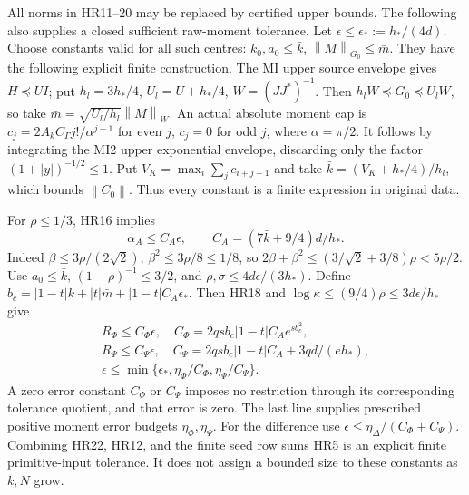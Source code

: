 \documentclass[11pt]{article}
\newcommand{\norm}[1]{\left\lVert#1\right\rVert}
\begin{document}
All norms in HR11--20 may be replaced by certified upper bounds.
The following also supplies a closed sufficient raw-moment tolerance.
Let \(\epsilon\le\epsilon_*:=h_*/(4d)\). Choose constants valid for
all such centres:
\(k_0,a_0\le\bar k\), \(\norm M_{G_0}\le\bar m\).
They have the following explicit finite construction. The MI upper
source envelope gives \(H\preceq UI\); put
\(h_l=3h_*/4\), \(U_l=U+h_*/4\), \(W=(JJ^*)^{-1}\).
Then \(h_lW\preceq G_0\preceq U_lW\), so take
\(\bar m=\sqrt{U_l/h_l}\norm M_W\).
An actual absolute moment cap is
\(c_j=2A_kC_\Gamma j!/\alpha^{j+1}\) for even \(j\),
\(c_j=0\) for odd \(j\), where \(\alpha=\pi/2\).
It follows by integrating the MI2 upper exponential envelope,
discarding only the factor \((1+|y|)^{-1/2}\le1\).
Put \(V_K=\max_i\sum_j c_{i+j+1}\) and take
\(\bar k=(V_K+h_*/4)/h_l\), which bounds \(\norm{C_0}\).
Thus every constant is a finite expression in original data.

For \(\rho\le1/3\), HR16 implies
\begin{equation}\tag{HR21}\label{HR21}
\alpha_A\le C_A\epsilon,\qquad
C_A=(7\bar k+9/4)d/h_*.
\end{equation}
Indeed \(\beta\le3\rho/(2\sqrt2)\),
\(\beta^2\le3\rho/8\le1/8\), so
\(2\beta+\beta^2\le(3/\sqrt2+3/8)\rho<5\rho/2\).
Use \(a_0\le\bar k\), \((1-\rho)^{-1}\le3/2\), and
\(\rho,\sigma\le4d\epsilon/(3h_*)\).
Define \(b_c=|1-t|\bar k+|t|\bar m+|1-t|C_A\epsilon_*\).
Then HR18 and \(\log\kappa\le(9/4)\rho\le3d\epsilon/h_*\) give
\begin{equation}\tag{HR22}\label{HR22}
\begin{gathered}
R_\Phi\le C_\Phi\epsilon,\quad
C_\Phi=2qs b_c|1-t|C_A e^{s b_c^2},\\
R_\Psi\le C_\Psi\epsilon,\quad
C_\Psi=2qs b_c|1-t|C_A+3qd/(e h_*),\\
\epsilon\le\min\{\epsilon_*,\eta_\Phi/C_\Phi,
\eta_\Psi/C_\Psi\}.
\end{gathered}
\end{equation}
A zero error constant \(C_\Phi\) or \(C_\Psi\) imposes no restriction
through its corresponding tolerance quotient, and that error is zero.
The last line supplies prescribed positive moment
error budgets \(\eta_\Phi,\eta_\Psi\). For the difference use
\(\epsilon\le\eta_\Delta/(C_\Phi+C_\Psi)\). Combining HR22, HR12,
and the finite seed row sums HR5 is an explicit finite primitive-input
tolerance. It does not assign a bounded size to these constants as
\(k,N\) grow.
\end{document}
